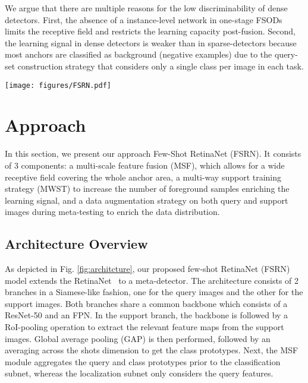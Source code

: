 \documentclass[10pt,twocolumn,letterpaper]{article}
\begin{document}
We argue that there are multiple reasons for the low discriminability of dense detectors. First, the absence of a instance-level network in one-stage FSODs limits the receptive field and restricts the learning capacity post-fusion. Second, the learning signal in dense detectors is weaker than in sparse-detectors because most anchors are classified as background (negative examples) due to the query-set construction strategy that considers only a single class per image in each task. 

 \begin{figure*}[t!]
 \centering
 \texttt{[image: figures/FSRN.pdf]}
 \caption{Overview of the our FSRN architecture. First, the multi-way support training strategy (MWST) constructs multi-way tasks per training episode, featuring multiple positive and negative classes. Thereby, more foreground anchors are sampled, resulting in improved discriminability. Next, a multi-scale feature fusion (MSF) module is used on top of the FPN that enables a wide receptive field covering the whole anchor area post-fusion. During meta-testing, an introduced multi-scale data augmentation scheme (MSDA) enriches the scale-space improving the discriminability for novel classes. Additionally, the proposed Gaussian Prototyping (GP) for improved class prototypes.} \label{fig:architcture}\vspace{-1.5em}
\end{figure*} \section{Approach}

In this section, we present our approach Few-Shot RetinaNet (FSRN). It consists of 3 components: a multi-scale feature fusion (MSF), which allows for a wide receptive field covering the whole anchor area, a multi-way support training strategy (MWST) to increase the number of foreground samples enriching the learning signal, and a data augmentation strategy on both query and support images during meta-testing to enrich the data distribution.

\subsection{Architecture Overview}
As depicted in Fig. \ref{fig:architcture}, our proposed few-shot RetinaNet (FSRN) model extends the RetinaNet~\cite{RetinaNet} to a meta-detector. The architecture consists of 2 branches in a Siamese-like fashion, one for the query images and the other for the support images. Both branches share a common backbone which consists of a ResNet-50 and an FPN. In the support branch, the backbone is followed by a RoI-pooling operation to extract the relevant feature maps from the support images. Global average pooling (GAP) is then performed, followed by an averaging across the shots dimension to get the class prototypes. Next, the MSF module aggregates the query and class prototypes prior to the classification subnet, whereas the localization subnet only considers the query features.    
\end{document}
